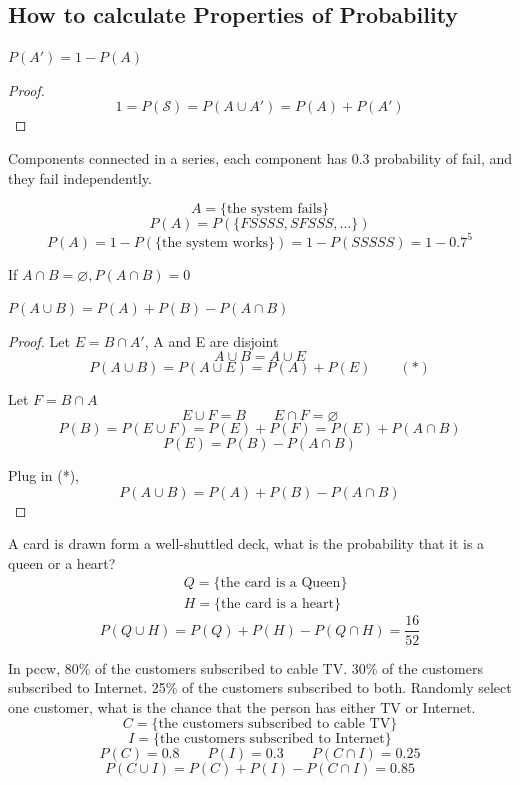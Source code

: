 \subsection{How to calculate Properties of Probability}

\begin{prop}
$P(A')=1 -P(A) $
\begin{proof}
\[1=P(\mathcal{S})=P(A \cup A')=P(A)+P(A')\]
\end{proof}
\end{prop}
  
\begin{exmp}
Components connected in a series, each component has 0.3 probability of fail, and they fail independently.
   
\[A=\{\text{the system fails}\}\]
\[P(A)=P(\{ FSSSS,SFSSS,\dots\})\]
\[P(A)=1-P(\{\text{the system works}\})=1-P(SSSSS)=1-0.7^5\]
\end{exmp}
  
\begin{prop}
  If $A\cap B =\varnothing, P(A \cap B)=0 $
\end{prop}
  
\begin{prop}
 $ P(A \cup B)= P(A) +P(B) -P(A \cap B) $
\begin{proof}
Let $E = B \cap A' $, A and E are disjoint
  \[A \cup B = A \cup E\]
  \[P(A\cup B)=P(A \cup E)=P(A)+P(E)  \qquad (*)\]

Let $F= B\cap A$
  \[E \cup F =B \qquad E \cap F =\varnothing\]
  \[ P(B) = P(E \cup F)=P(E) + P(F)=P(E)+P(A\cap B)  \]
  \[P(E)= P(B)- P(A \cap B) \]

Plug in (*),\[  P(A \cup B)= P(A) +P(B) -P(A \cap B)  \]
\end{proof}
\end{prop}


\begin{exmp}
A card is drawn form a well-shuttled deck, what is the probability that it is a queen or a heart?
\begin{align*}
&Q=\{\text{the card is a Queen}\}\\
&H=\{\text{the card is a heart}\}
\end{align*}
\[P(Q \cup H)=P(Q)+P(H)-P(Q \cap H)=\frac{16}{52}\]
\end{exmp}

\begin{exmp}
In pccw, 80\% of the customers subscribed to cable TV. 30\% of the customers subscribed to Internet. 25\% of the customers subscribed to both.
Randomly select one customer, what is the chance that the person has either TV or Internet.
\[C=\{\text{the customers subscribed to cable TV}\}\]
\[I=\{\text{the customers subscribed to Internet} \}\]
\[P(C)=0.8 \qquad P(I)=0.3 \qquad P(C\cap I)=0.25\]
\[P(C\cup I)=P(C)+P(I)-P(C\cap I)=\boxed{0.85}\]
\end{exmp}

